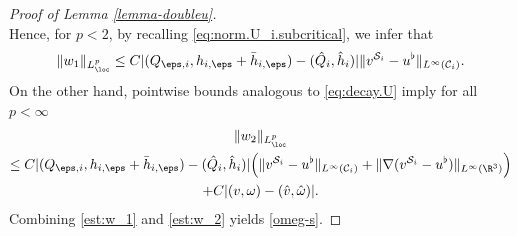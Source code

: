 \begin{proof}[Proof of Lemma \ref{lemma-doubleu}]
\begin{equation}
\end{equation}
Hence, for $p<2$, by recalling \eqref{eq:norm.U_i.subcritical}, we infer that
\begin{equation} \label{est:w_1}
\|w_1\|_{L^p_{\loc}} \leq C |(Q_{\eps,i},h_{i,\eps} + \bar h_{i,\eps}) - (\hat Q_i,\hat h_i)| \| v^{{\mathcal S}_i} - u^\flat\|_{L^\infty(\mathcal C_i)}.
\end{equation}
On the other hand, pointwise bounds analogous to \eqref{eq:decay.U}
imply for all $p < \infty$
\begin{multline} \label{est:w_2}
\|w_2\|_{L^p_{\loc}}\\
\leq C |(Q_{\eps,i},h_{i,\eps} + \bar h_{i,\eps}) - (\hat Q_i,\hat h_i)| \Bigl(\| v^{{\mathcal S}_i} - u^\flat\|_{L^{\infty}(\mathcal C_i)} + \| \nabla(v^{{\mathcal S}_i} - u^\flat)\|_{L^{\infty}(\R^3)} \Bigr) \\
+ C |(v,\omega) - (\hat v,\hat \omega)|.
\end{multline}
Combining \eqref{est:w_1} and \eqref{est:w_2} yields \eqref{omeg-s}.


\end{proof}
